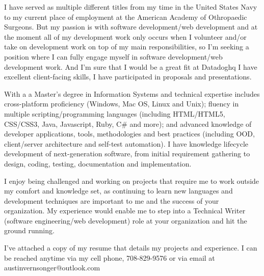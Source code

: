 \documentclass[9pt, a4paper]{awesome-cv}
\begin{document}
\makecvheader

\makelettertitle

\begin{cvletter}




I have served as multiple different titles from my time in the United States Navy to my current place of employment at the American Academy of Othropaedic Surgeons. But my passion is with software development/web development and at the moment all of my development work only occurs when I volunteer and/or take on development work on top of my main responsibilities, so I'm seeking a position where I can fully engage myself in software development/web development work. And I'm sure that I would be a great fit at
Datadoghq
I have excellent client-facing skills, I have participated in proposals and presentations. 

With a a Master’s degree in Information Systems and technical expertise includes cross-platform proficiency (Windows, Mac OS, Linux and Unix); fluency in multiple scripting/programming languages (including HTML/HTML5, CSS/CSS3, Java, Javascript, Ruby, C# and more); and advanced knowledge of developer applications, tools, methodologies and best practices (including OOD, client/server architecture and self-test automation). I have knowledge lifecycle development of next-generation software, from initial requirement gathering to design, coding, testing, documentation and implementation.

I enjoy being challenged and working on projects that require me to work outside my comfort and knowledge set, as continuing to learn new languages and development techniques are important to me and the success of your organization. My experience would enable me to step into a Technical Writer (software engineering/web development) role at your organization and hit the ground running.

I’ve attached a copy of my resume that details my projects and experience. I can be reached anytime via my cell phone, 708-829-9576 or via email at austinvernsonger@outlook.com

\end{cvletter}

\makeletterclosing
\end{document}
